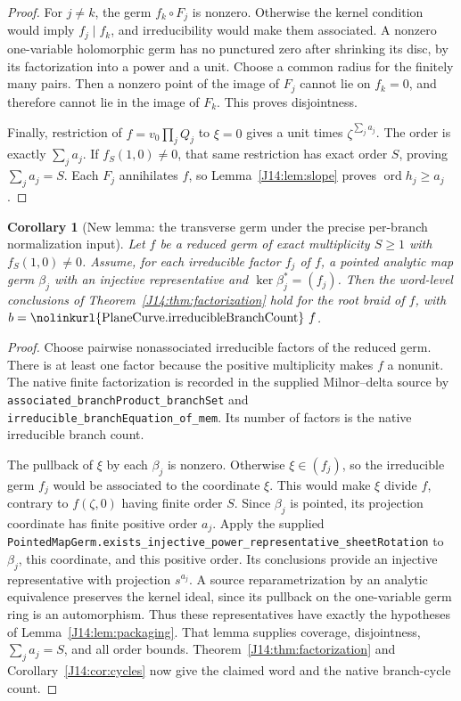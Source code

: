 \documentclass[11pt,oneside]{report}
\newtheorem{corollary}[theorem]{Corollary}
\theoremstyle{definition}
\numberwithin{equation}{section}
\newcommand{\decl}[1]{\textnormal{\nolinkurl{#1}}}
\newcommand{\ord}{\operatorname{ord}}
\begin{document}
\begin{proof}
For $j\ne k$, the germ $f_k\circ F_j$ is nonzero. Otherwise the kernel
condition would imply $f_j\mid f_k$, and irreducibility would make them
associated. A nonzero one-variable holomorphic germ has no punctured zero
after shrinking its disc, by its factorization into a power and a unit.
Choose a common radius for the finitely many pairs. Then a nonzero point
of the image of $F_j$ cannot lie on $f_k=0$, and therefore cannot lie in
the image of $F_k$. This proves disjointness.

Finally, restriction of $f=v_0\prod_jQ_j$ to $\xi=0$ gives a unit times
$\zeta^{\sum_j a_j}$. The order is exactly $\sum_j a_j$.
If $f_S(1,0)\ne0$, that same restriction has exact order $S$, proving
$\sum_j a_j=S$. Each $F_j$ annihilates $f$, so Lemma~\ref{J14:lem:slope}
proves $\ord h_j\geq a_j$.
\end{proof}

\begin{corollary}[New lemma: the transverse germ under the precise
per-branch normalization input]\label{J14:cor:germ}
Let $f$ be a reduced germ of exact multiplicity $S\geq1$ with
$f_S(1,0)\ne0$. Assume, for each irreducible factor $f_j$ of $f$, a pointed
analytic map germ $\beta_j$ with an injective representative and
$\ker\beta_j^*=(f_j)$. Then the word-level conclusions of
Theorem~\ref{J14:thm:factorization} hold for the root braid of $f$, with
$b=\decl{PlaneCurve.irreducibleBranchCount}\ f$.
\end{corollary}
\begin{proof}
Choose pairwise nonassociated irreducible factors of the reduced germ.
There is at least one factor because the positive multiplicity makes $f$
a nonunit.
The native finite factorization is recorded in the supplied Milnor--delta
source by \decl{associated_branchProduct_branchSet} and
\decl{irreducible_branchEquation_of_mem}. Its number of factors is the
native irreducible branch count.

The pullback of $\xi$ by each $\beta_j$ is nonzero. Otherwise
$\xi\in(f_j)$, so the irreducible germ $f_j$ would be associated to the
coordinate $\xi$. This would make $\xi$ divide $f$, contrary to
$f(\zeta,0)$ having finite order $S$. Since $\beta_j$ is pointed, its
projection coordinate has finite positive order $a_j$.
Apply the supplied
\decl{PointedMapGerm.exists_injective_power_representative_sheetRotation}
to $\beta_j$, this coordinate, and this positive order.
Its conclusions provide an injective representative with projection
$s^{a_j}$. A source reparametrization by an analytic equivalence preserves
the kernel ideal, since its pullback on the one-variable germ ring is an
automorphism. Thus these representatives have exactly the hypotheses of
Lemma~\ref{J14:lem:packaging}.
That lemma supplies coverage, disjointness, $\sum_j a_j=S$, and all order
bounds. Theorem~\ref{J14:thm:factorization} and Corollary~\ref{J14:cor:cycles}
now give the claimed word and the native branch-cycle count.
\end{proof}
\end{document}
